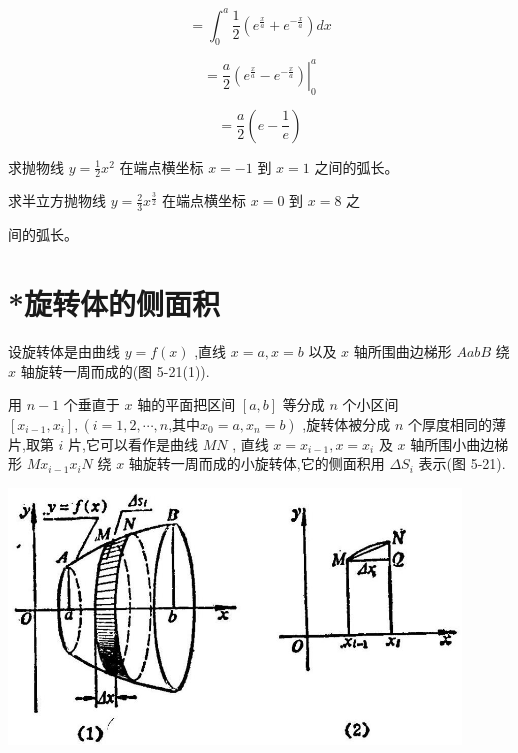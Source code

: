 \documentclass[lang=cn,newtx,12pt,scheme=chinese]{elegantbook}
\begin{document}
\[
= {\int }_{0}^{a}\frac{1}{2}\left( {{e}^{\frac{x}{a}} + {e}^{-\frac{x}{a}}}\right) {dx}
\]

\[
= {\left. \frac{a}{2}\left( {e}^{\frac{x}{a}} - {e}^{-\frac{x}{a}}\right) \right| }_{0}^{a}
\]

\[
= \frac{a}{2}\left( {e - \frac{1}{e}}\right)
\]

\begin{problemset}[练习]

\item 求抛物线 \(y = \frac{1}{2}{x}^{2}\) 在端点横坐标 \(x = - 1\) 到 \(x = 1\) 之间的弧长。

\item 求半立方抛物线 \(y = \frac{2}{3}{x}^{\frac{3}{2}}\) 在端点横坐标 \(x = 0\) 到 \(x = 8\) 之

间的弧长。
\end{problemset}

\section{*旋转体的侧面积}

设旋转体是由曲线 \(y = f\left( x\right)\) ,直线 \(x = a,x = b\) 以及 \(x\) 轴所围曲边梯形 \({AabB}\) 绕 \(x\) 轴旋转一周而成的(图 5-21(1)).

用 \(n - 1\) 个垂直于 \(x\) 轴的平面把区间 \(\left\lbrack {a,b}\right\rbrack\) 等分成 \(n\) 个小区间 \(\left\lbrack {{x}_{i - 1},{x}_{i}}\right\rbrack ,\left( {i = 1,2,\cdots ,n\text{,其中}{x}_{0} = a,{x}_{n} = b}\right)\) ,旋转体被分成 \(n\) 个厚度相同的薄片,取第 \(i\) 片,它可以看作是曲线 \({MN}\) , 直线 \(x = {x}_{i - 1},x = {x}_{i}\) 及 \(x\) 轴所围小曲边梯形 \(M{x}_{i - 1}{x}_{i}N\) 绕 \(x\) 轴旋转一周而成的小旋转体,它的侧面积用 \(\Delta {S}_{i}\) 表示(图 5-21).

\begin{center}
\includegraphics[max width=0.9\textwidth]{images/01912c18-5c3f-733d-b775-749ba9897a9d_244_731175.jpg}
\end{center}
\end{document}
